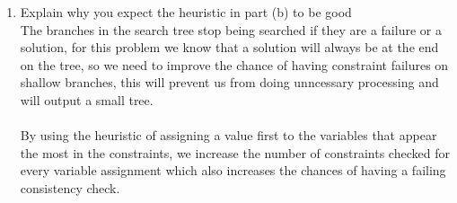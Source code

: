 \documentclass{article}
\def\ans#1{{\color{ans}#1}}
\begin{document}
\begin{enumerate}[label=(\alph*)]
    \item Explain why you expect the heuristic in part (b) to be good \\
    \ans{
        The branches in the search tree stop being searched if they are a failure or a solution, for this 
        problem we know that a solution will always be at the end on the tree, so we need to improve the 
        chance of having constraint failures on shallow branches, this will prevent us from doing unncessary 
        processing and will output a small tree. \\ \\
        By using the heuristic of assigning a value first to the variables that appear the most in 
        the constraints, we increase the number of constraints checked for every variable assignment which 
        also increases the chances of having a failing consistency check.
    }
\end{enumerate}

\clearpage
\end{document}

